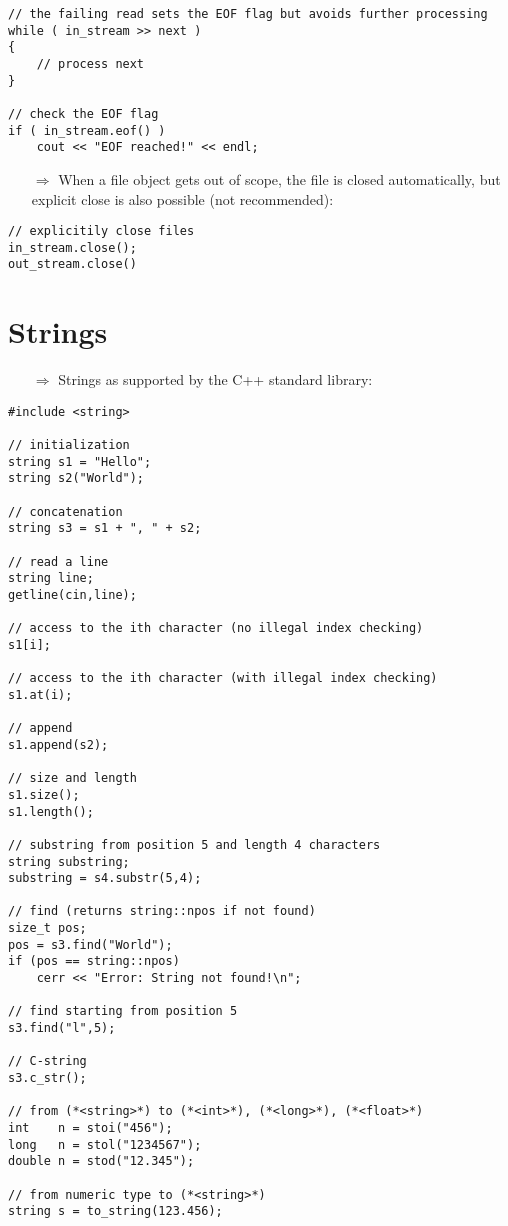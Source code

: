 \documentclass[10pt]{article}
\begin{document}
\begin{lstlisting}
// the failing read sets the EOF flag but avoids further processing
while ( in_stream >> next )
{
    // process next
}

// check the EOF flag
if ( in_stream.eof() )
    cout << "EOF reached!" << endl;
\end{lstlisting}
\begin{enumerate}
\item[$\Rightarrow$] When a file object gets out of scope, the file is closed automatically, but explicit
close is also possible (not recommended):
\end{enumerate}
\begin{lstlisting}
// explicitily close files
in_stream.close();
out_stream.close()
\end{lstlisting}
%
%
\section{Strings}
\small
\begin{enumerate}
\item[$\Rightarrow$] Strings as supported by the C++ standard library:
\end{enumerate}
\begin{lstlisting}
#include <string>

// initialization
string s1 = "Hello";
string s2("World");

// concatenation
string s3 = s1 + ", " + s2;

// read a line
string line;
getline(cin,line);

// access to the ith character (no illegal index checking)
s1[i];

// access to the ith character (with illegal index checking)
s1.at(i);

// append
s1.append(s2);

// size and length
s1.size();
s1.length();

// substring from position 5 and length 4 characters
string substring;
substring = s4.substr(5,4);

// find (returns string::npos if not found)
size_t pos;
pos = s3.find("World");
if (pos == string::npos)
    cerr << "Error: String not found!\n";

// find starting from position 5
s3.find("l",5);

// C-string
s3.c_str();

// from (*<string>*) to (*<int>*), (*<long>*), (*<float>*)
int    n = stoi("456");
long   n = stol("1234567");
double n = stod("12.345");

// from numeric type to (*<string>*)
string s = to_string(123.456);
\end{lstlisting}
%
%
\end{document}
